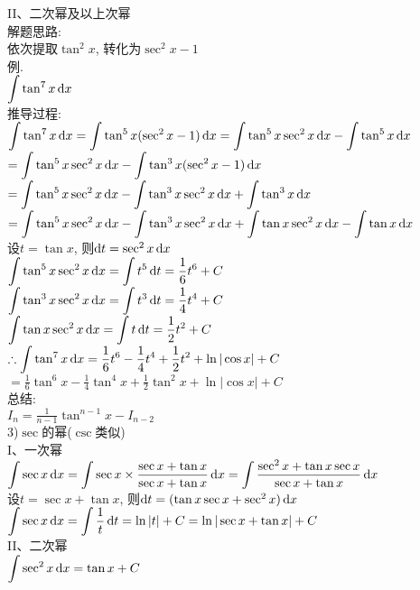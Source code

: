 II、二次幂及以上次幂\\
解题思路:\\
依次提取$\tan^2x$, 转化为$\sec^2x-1$\\
例.\\
\phantom{例}$\displaystyle\int\tan^7x\dif x$\\
推导过程:\\
$\displaystyle\int\tan^7x\mathop{}\!\mathrm{d} x=\int\tan^5x(\sec^2x-1)\mathop{}\!\mathrm{d} x=\int\tan^5x\sec^2x\mathop{}\!\mathrm{d} x-\int\tan^5x\mathop{}\!\mathrm{d} x$\\
\phantom{$\displaystyle\int\tan^7x\dif x$}$\displaystyle=\int\tan^5x\sec^2x\mathop{}\!\mathrm{d} x-\int\tan^3x(\sec^2x-1)\mathop{}\!\mathrm{d} x$\\
\phantom{$\displaystyle\int\tan^7x\dif x$}$\displaystyle=\int\tan^5x\sec^2x\mathop{}\!\mathrm{d} x-\int\tan^3x\sec^2x\mathop{}\!\mathrm{d} x+\int\tan^3x\mathop{}\!\mathrm{d} x$\\
\phantom{$\displaystyle\int\tan^7x\dif x$}$\displaystyle=\int\tan^5x\sec^2x\mathop{}\!\mathrm{d} x-\int\tan^3x\sec^2x\mathop{}\!\mathrm{d} x+\int\tan x\sec^2x\mathop{}\!\mathrm{d} x-\int\tan x\mathop{}\!\mathrm{d} x$\\
设$t=\tan x$, 则$\mathop{}\!\mathrm{d} t=\sec^2x\mathop{}\!\mathrm{d} x$\\
$\displaystyle\int\tan^5x\sec^2x\mathop{}\!\mathrm{d} x=\int t^5\mathop{}\!\mathrm{d} t=\frac{1}{6}t^6+C$\\
$\displaystyle\int\tan^3x\sec^2x\mathop{}\!\mathrm{d} x=\int t^3\mathop{}\!\mathrm{d} t=\frac{1}{4}t^4+C$\\
$\displaystyle\int\tan x\sec^2x\mathop{}\!\mathrm{d} x=\int t\mathop{}\!\mathrm{d} t=\frac{1}{2}t^2+C$\\
$\displaystyle\therefore\int\tan^7x\mathop{}\!\mathrm{d} x=\frac{1}{6}t^6-\frac{1}{4}t^4+\frac{1}{2}t^2+\ln|\cos x|+C$\\
\phantom{$\displaystyle\therefore\int\tan^7x\dif x$}$\displaystyle=\frac{1}{6}\tan^6x-\frac{1}{4}\tan^4x+\frac{1}{2}\tan^2x+\ln|\cos x|+C$\\
总结:\\
$\displaystyle I_n=\frac{1}{n-1}\tan^{n-1}x-I_{n-2}$\\

3)$\sec$的幂($\csc$类似)\\
I、一次幂\\
$\displaystyle\int\sec x\mathop{}\!\mathrm{d} x=\int\sec x\times\frac{\sec x+\tan x}{\sec x+\tan x}\mathop{}\!\mathrm{d} x=\int\frac{\sec^2x+\tan x\sec x}{\sec x+\tan x}\mathop{}\!\mathrm{d} x$\\
设$t=\sec x+\tan x$, 则$\mathop{}\!\mathrm{d} t=(\tan x\sec x+\sec^2x)\mathop{}\!\mathrm{d} x$\\
$\displaystyle\int\sec x\mathop{}\!\mathrm{d} x=\int\frac{1}{t}\mathop{}\!\mathrm{d} t=\ln|t|+C=\ln|\sec x+\tan x|+C$\\

II、二次幂\\
$\displaystyle\int\sec^2x\mathop{}\!\mathrm{d} x=\tan x+C$\\


